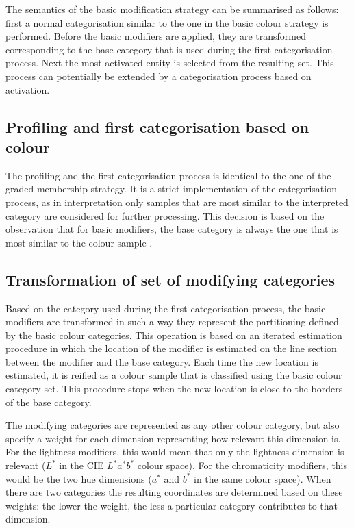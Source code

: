 The semantics of the basic modification strategy can be
summarised as follows: first a normal categorisation similar to the
one in the basic colour strategy is performed. Before the
basic modifiers are applied, they are transformed corresponding
to the base category that is used during the first categorisation
process. Next the most activated entity is selected from the resulting
set. This process can potentially be extended by a categorisation
process based on activation.

\subsection{Profiling and first categorisation based on colour}

The profiling and the first categorisation process is identical to the
one of the graded membership strategy. It is a strict
implementation of the categorisation process, as in interpretation
only samples that are most similar to the interpreted category are
considered for further processing. This decision is based on the
observation that for basic modifiers, the base category is always
the one that is most similar to the colour sample
\citep{safuanova07russian}.

\subsection{Transformation of set of modifying categories}

Based on the category used during the first categorisation process,
the basic modifiers are transformed in such a way they represent 
the partitioning defined by the basic colour categories. This
operation is based on an iterated estimation procedure in which the
location of the modifier is estimated on the line section between the
modifier and the base category. Each time the new location is
estimated, it is reified as a colour sample that is classified using
the basic colour category set. This procedure stops when the new
location is close to the borders of the base category.

The modifying categories are represented as any other colour category,
but also specify a weight for each dimension representing how
relevant this dimension is. For the lightness modifiers, this would
mean that only the lightness dimension is relevant ($L^*$ in the CIE $L^*a^*b^*$ colour
space). For the chromaticity modifiers, this would be the two hue
dimensions ($a^*$ and $b^*$ in the same colour space). When there are two
categories the resulting coordinates are determined based on these
weights: the lower the weight, the less a particular category
contributes to that dimension.

